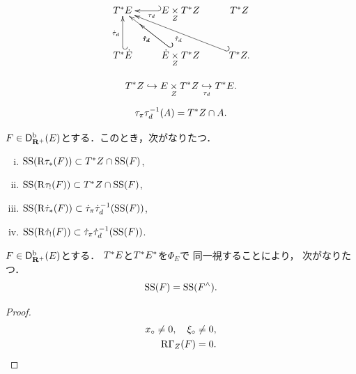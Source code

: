 \begin{equation}
    \vcenter{\xymatrix{
        \cotb[E]
        &
        E\pb[Z]\cotb[Z]
        \ar@{_{(}->}[l]-^{\mdiff[\tau]}
        &
        \cotb[Z]\\
        \ar@{_{(}->}[u]-^{\mdiff[\dot{\tau}]}
        \cotb[{\dot{E}}]
        &
        \ar@{_{(}->}[u]-^{\mdiff[\dot{\tau}]}
        \ar@{_{(}->}[l]-^{\mdiff[\dot{\tau}]}
        \dot{E}\pb[Z]\cotb[Z]
        &
        \ar@{_{(}->}[u]-^{\mdiff[\dot{\tau}]}
        \cotb[Z].
    }}
\end{equation}

\begin{equation}
    \cotb[Z]\hookrightarrow
    E\pb[Z]\cotb[Z]
    \underset{\mdiff[\tau]}{\hookrightarrow}
    \cotb[E].
\end{equation}



\begin{equation}
    \mpb[\tau]\mdiff[\tau]^{-1}(A)=\cotb[Z]\cap A.
\end{equation}

\begin{leftbar}
\begin{PRP}
    \(F\in\Dbconic(E)\)とする．このとき，次がなりたつ．
    \begin{enumerate}[(i)]
        \item \(\muS(\Rder{\tau_{\ast}}(F))\subset \cotb[Z]\cap\muS(F)\),
        \item \(\muS(\Rder{\tau_{!}}(F))\subset \cotb[Z]\cap\muS(F)\),
        \item \(\muS(\Rder{\dot{\tau}_{\ast}}(F))\subset \mpb[\dot{\tau}]\mdiff[\dot{\tau}]^{-1}(\muS(F))\),
        \item \(\muS(\Rder{\dot{\tau}_{!}}(F))\subset \mpb[\dot{\tau}]\mdiff[\dot{\tau}]^{-1}(\muS(F))\).
    \end{enumerate}
\end{PRP}
\end{leftbar}


\begin{leftbar}
\begin{THM}
    \(F\in\Dbconic(E)\)とする．
    \(\cotb[E]\)と\(\cotb[E^{\ast}]\)を\(\varPhi_{E}\)で
    同一視することにより，
    次がなりたつ．
    \[
        \muS(F)=\muS(F^{\wedge}).
    \]
\end{THM}
\end{leftbar}

\begin{proof}
    \begin{align}
        x_{\circ}\ne0,
        \quad
        \xi_{\circ}\ne0,\label{eq:5512}\\
        \RG_{Z}(F)=0.\label{eq:5513}    
    \end{align}
\end{proof}
